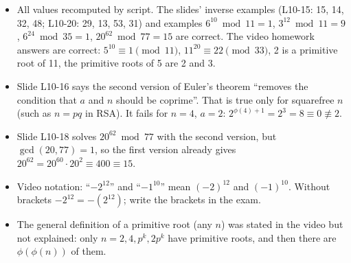 \begin{fixbox}
\begin{itemize}
  \item All values recomputed by script. The slides' inverse examples (L10-15: 15, 14, 32, 48; L10-20: 29, 13, 53, 31) and examples $6^{10} \bmod 11 = 1$, $3^{12} \bmod 11 = 9$, $6^{24} \bmod 35 = 1$, $20^{62} \bmod 77 = 15$ are correct. The video homework answers are correct: $5^{10} \equiv 1 \pmod{11}$, $11^{20} \equiv 22 \pmod{33}$, 2 is a primitive root of 11, the primitive roots of 5 are 2 and 3.
  \item Slide L10-16 says the second version of Euler's theorem ``removes the condition that $a$ and $n$ should be coprime''. That is true only for squarefree $n$ (such as $n = pq$ in RSA). It fails for $n = 4$, $a = 2$: $2^{\phi(4)+1} = 2^3 = 8 \equiv 0 \not\equiv 2$.
  \item Slide L10-18 solves $20^{62} \bmod 77$ with the second version, but $\gcd(20, 77) = 1$, so the first version already gives $20^{62} = 20^{60} \cdot 20^2 \equiv 400 \equiv 15$.
  \item Video notation: ``$-2^{12}$'' and ``$-1^{10}$'' mean $(-2)^{12}$ and $(-1)^{10}$. Without brackets $-2^{12} = -(2^{12})$; write the brackets in the exam.
  \item The general definition of a primitive root (any $n$) was stated in the video but not explained: only $n = 2, 4, p^k, 2p^k$ have primitive roots, and then there are $\phi(\phi(n))$ of them.
\end{itemize}
\end{fixbox}
